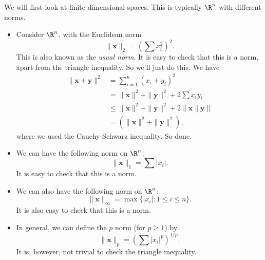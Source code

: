 \documentclass[a4paper]{article}
\begin{document}
\begin{eg}
  We will first look at finite-dimensional spaces. This is typically $\R^n$ with different norms.
  \begin{itemize}
    \item Consider $\R^n$, with the Euclidean norm
      \[
        \|\mathbf{x}\|_2 = \left(\sum x_i^2\right)^2.
      \]
      This is also known as the \emph{usual norm}. It is easy to check that this is a norm, apart from the triangle inequality. So we'll just do this. We have
      \begin{align*}
        \|\mathbf{x} + \mathbf{y}\|^2 &= \sum_{i = 1}^n (x_i + y_i)^2 \\
        &= \|\mathbf{x}\|^2 + \|\mathbf{y}\|^2 + 2\sum x_i y_i \\
        &\leq \|\mathbf{x}\|^2 + \|\mathbf{y}\|^2 + 2\|\mathbf{x}\|\mathbf{y}\| \\
        &= (\|\mathbf{x}\|^2 + \|\mathbf{y}\|^2),
      \end{align*}
      where we used the Cauchy-Schwarz inequality. So done.
    \item We can have the following norm on $\R^n$:
      \[
        \|\mathbf{x}\|_1 = \sum |x_i|.
      \]
      It is easy to check that this is a norm.
    \item We can also have the following norm on $\R^n$:
      \[
        \|\mathbf{x}\|_\infty = \max\{|x_i|: 1 \leq i \leq n\}.
      \]
      It is also easy to check that this is a norm.
    \item In general, we can define the $p$ norm (for $p \geq 1$) by
      \[
        \|\mathbf{x}\|_p = \left(\sum |x_i|^p\right)^{1/p}.
      \]
      It is, however, not trivial to check the triangle inequality.


\end{itemize}
\end{eg}
\end{document}
